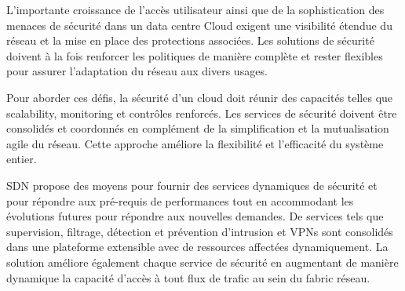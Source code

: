 L'importante croissance de l'accès utilisateur ainsi que de la sophistication des menaces de sécurité dans un data centre Cloud exigent une visibilité étendue du réseau et la mise en place des protections associées. Les solutions de sécurité doivent à la fois renforcer les politiques de manière complète et rester flexibles pour assurer l'adaptation du réseau aux divers usages.


Pour aborder ces défis, la sécurité d'un cloud doit réunir des capacités telles que \gls{scalability}, monitoring et contrôles renforcés. Les services de sécurité doivent être consolidés et coordonnés en complément de la simplification et la mutualisation agile du réseau. Cette approche améliore la flexibilité et l'efficacité du système entier.

SDN propose des moyens pour fournir des services dynamiques de sécurité et pour répondre aux pré-requis de performances tout en accommodant les évolutions futures pour répondre aux nouvelles demandes. De services tels que supervision, filtrage, détection et prévention d'intrusion et VPNs sont consolidés dans une plateforme extensible avec de ressources affectées dynamiquement. La solution améliore également chaque service de sécurité en augmentant de manière dynamique la capacité d'accès à tout flux de trafic au sein du \gls{fabric} réseau.

